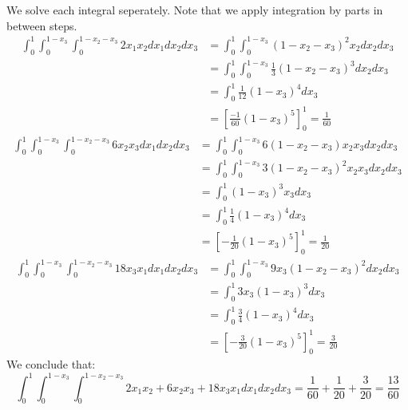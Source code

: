 \documentclass[11pt]{article}
\begin{document}
\begin{solution}
    We solve each integral seperately. Note that we apply integration by parts in between steps. 
    \begin{align*}
        \int_{0}^{1}\int_{0}^{1 - x_3}\int_{0}^{1 - x_2 - x_3} 2x_1x_2 dx_1 dx_2 dx_3
        &= \int_{0}^{1}\int_{0}^{1 - x_3} (1-x_2-x_3)^2 x_2 dx_2 dx_3\\
        &= \int_{0}^{1}\int_{0}^{1 - x_3} \frac{1}{3}(1-x_2-x_3)^3 dx_2 dx_3\\
        &= \int_{0}^{1} \frac{1}{12}(1-x_3)^4 dx_3\\
        &= \left[ \frac{-1}{60}(1-x_3)^5\right]_0^1 = \frac{1}{60}
    \end{align*}
    \begin{align*}
        \int_{0}^{1}\int_{0}^{1 - x_3}\int_{0}^{1 - x_2 - x_3} 6x_2x_3  dx_1 dx_2 dx_3 &= \int_{0}^{1}\int_{0}^{1 - x_3} 6(1 - x_2 - x_3) x_2 x_3   dx_2 dx_3 \\
	&= \int_{0}^{1}\int_{0}^{1 - x_3} 3(1 - x_2 - x_3)^2 x_2 x_3   dx_2 dx_3 \\
	&= \int_{0}^{1} (1 - x_3)^3 x_3   dx_3 \\
	&= \int_{0}^{1} \frac{1}{4}(1 - x_3)^4  dx_3 \\
	&= \left[-\frac{1}{20}(1 - x_3)^5 \right]_0^1 = \frac{1}{20}
    \end{align*}
	\begin{align*}
         \int_{0}^{1}\int_{0}^{1 - x_3}\int_{0}^{1 - x_2 - x_3} 18x_3x_1 dx_1 dx_2 dx_3&= \int_{0}^{1}\int_{0}^{1 - x_3} 9x_3(1-x_2-x_3)^2   dx_2 dx_3 \\
        &=\int_{0}^{1} 3x_3(1-x_3)^3  dx_3 \\
        &= \int_{0}^{1} \frac{3}{4}(1-x_3)^4  dx_3 \\
        &= \left[-\frac{3}{20}(1-x_3)^5  \right]_0^1 =\frac{3}{20}
    \end{align*}
    We conclude that:
    $$
    \int_{0}^{1}\int_{0}^{1 - x_3}\int_{0}^{1 - x_2 - x_3} 2x_1x_2 + 6x_2x_3 + 18x_3x_1 dx_1 dx_2 dx_3 = \frac{1}{60} + \frac{1}{20} + \frac{3}{20} = \frac{13}{60}
    $$
\end{solution}
\end{document}
